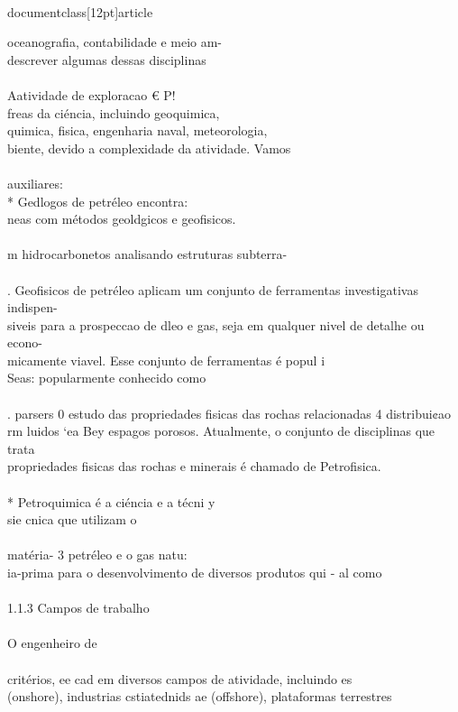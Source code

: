 \\documentclass[12pt]{article}
\begin{document}
{oceanografia, contabilidade e meio am-\\
descrever algumas dessas disciplinas\\
\\
Aatividade de exploracao € P!\\
freas da ciéncia, incluindo geoquimica,\\
quimica, fisica, engenharia naval, meteorologia,\\
biente, devido a complexidade da atividade. Vamos\\
\\
auxiliares:\\
* Gedlogos de petréleo encontra:\\
neas com métodos geoldgicos e geofisicos.\\
\\
m hidrocarbonetos analisando estruturas subterra-\\
\\
. Geofisicos de petréleo aplicam um conjunto de ferramentas investigativas indispen-\\
siveis para a prospeccao de dleo e gas, seja em qualquer nivel de detalhe ou econo-\\
micamente viavel. Esse conjunto de ferramentas é popul i\\
Seas: popularmente conhecido como\\
\\
. parsers 0 estudo das propriedades fisicas das rochas relacionadas 4 distribui¢ao\\
rm luidos ‘ea Bey espagos porosos. Atualmente, o conjunto de disciplinas que trata\\
propriedades fisicas das rochas e minerais é chamado de Petrofisica.\\
\\
* Petroquimica é a ciéncia e a técni y\\
sie cnica que utilizam o\\
\\
matéria- 3 petréleo e o gas natu:\\
ia-prima para o desenvolvimento de diversos produtos qui - al como\\
\\
1.1.3 Campos de trabalho\\
\\
O engenheiro de\\
\\
critérios, ee cad em diversos campos de atividade, incluindo es\\
(onshore), industrias cstiatednids ae (offshore), plataformas terrestres\\
}
\end{document}
